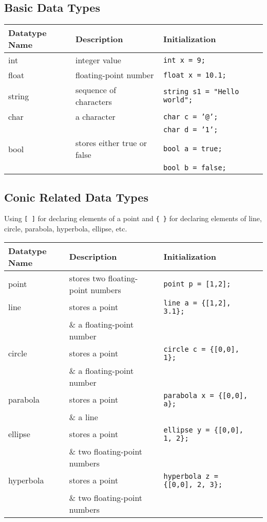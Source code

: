 \documentclass[12pt]{fphw}
\begin{document}
\subsection{Basic Data Types}
\begin{center}
\begin{tabular}{|l|l|l|}
\hline
Datatype Name & Description & Initialization \\
\hline
int & integer value & \texttt{int x = 9;} \\
\hline
float & floating-point number & \texttt{float x = 10.1;} \\
\hline
string & sequence of characters & \texttt{string s1 = "Hello world";} \\
\hline
char & a character & \texttt{char c = '@';} \\
 & & \texttt{char d = '1';} \\
 \hline
bool & stores either true or false & \texttt{bool a = true;} \\

 & & \texttt{bool b = false;} \\
\hline
\end{tabular}
\end{center}

\subsection{Conic Related Data Types}

Using \texttt{[ ]} for declaring elements of a point and \texttt{\{ \}} for declaring elements of line, circle, parabola, hyperbola, ellipse, etc.

\begin{center}
\begin{tabular}{|l|l|l|l|}
\hline
Datatype Name & Description & Initialization \\
\hline
point & stores two floating-point numbers & \texttt{point p = [1,2];} \\
\hline
line & stores a point  & \texttt{line a = \{[1,2], 3.1\};} \\
& \& a floating-point number&\\
\hline
circle & stores a point  & \texttt{circle c = \{[0,0], 1\};} \\
& \& a floating-point number&\\
\hline
parabola & stores a point & \texttt{parabola x = \{[0,0], a\};} \\
& \& a line &\\
\hline
ellipse & stores a point & \texttt{ellipse y = \{[0,0], 1, 2\};} \\
& \& two floating-point numbers &\\
\hline
hyperbola & stores a point & \texttt{hyperbola z = \{[0,0], 2, 3\};} \\
&\& two floating-point numbers  &\\
\hline
\end{tabular}
\end{center}
\end{document}

